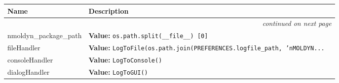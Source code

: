     \vspace{-1cm}
\hspace{\varindent}\begin{longtable}{|p{\varnamewidth}|p{\vardescrwidth}|l}
\cline{1-2}
\cline{1-2} \centering \textbf{Name} & \centering \textbf{Description}& \\
\cline{1-2}
\endhead\cline{1-2}\multicolumn{3}{r}{\small\textit{continued on next page}}\\\endfoot\cline{1-2}
\endlastfoot\raggedright n\-m\-o\-l\-d\-y\-n\-\_\-p\-a\-c\-k\-a\-g\-e\-\_\-p\-a\-t\-h\- & \raggedright \textbf{Value:} 
{\tt os.path.split(\_\_file\_\_) [0]}&\\
\cline{1-2}
\raggedright f\-i\-l\-e\-H\-a\-n\-d\-l\-e\-r\- & \raggedright \textbf{Value:} 
{\tt LogToFile(os.path.join(PREFERENCES.logfile\_path, 'nMOLDYN\texttt{...}}&\\
\cline{1-2}
\raggedright c\-o\-n\-s\-o\-l\-e\-H\-a\-n\-d\-l\-e\-r\- & \raggedright \textbf{Value:} 
{\tt LogToConsole()}&\\
\cline{1-2}
\raggedright d\-i\-a\-l\-o\-g\-H\-a\-n\-d\-l\-e\-r\- & \raggedright \textbf{Value:} 
{\tt LogToGUI()}&\\
\cline{1-2}
\end{longtable}

